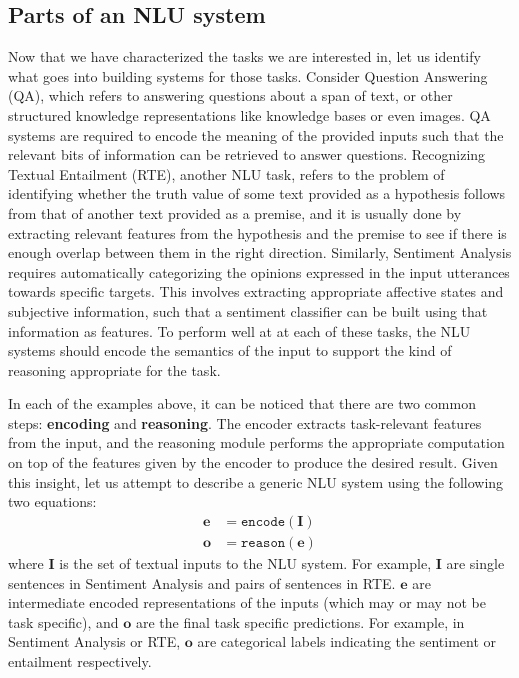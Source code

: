 \subsection{Parts of an NLU system}
Now that we have characterized the tasks we are interested in, let us identify
what goes into building systems for those tasks.
Consider Question Answering (QA), which refers to answering questions about a span of text,
or other structured knowledge representations like knowledge bases or even images.
QA systems are required to encode the meaning of the provided inputs such that the relevant bits of information can be retrieved to answer questions.
Recognizing Textual Entailment (RTE), another NLU task, refers to the problem of identifying whether the truth value of some text provided as a hypothesis follows from that of another 
text provided as a premise, and it is usually done by extracting relevant features from the hypothesis and the premise to see if there is enough
overlap between them in the right direction. Similarly, Sentiment Analysis requires automatically categorizing the opinions expressed in the input
utterances towards specific targets. This involves extracting appropriate affective states and subjective information, such that a sentiment classifier
can be built using that information as features. To perform well at at each of these tasks, the NLU systems should encode the semantics of the input to support the
kind of reasoning appropriate for the task.

In each of the examples above, it can be noticed that there are two common steps: \textbf{encoding} and \textbf{reasoning}. The encoder
extracts task-relevant features from the input, and the reasoning module performs the appropriate computation on top of the features given by the encoder
to produce the desired result. Given this insight, let us attempt to describe a generic NLU system using the following two equations:
\begin{align}
 \mathbf{e} &= \mathtt{encode}(\mathbf{I}) \label{eq:generic_encoding}\\
 \mathbf{o} &= \mathtt{reason}(\mathbf{e}) \label{eq:generic_reasoning}
\end{align}
where $\mathbf{I}$ is the set of textual inputs to the NLU system. 
For example, $\mathbf{I}$  are single sentences in Sentiment Analysis and pairs of sentences in RTE\@. $\textbf{e}$ are intermediate 
encoded representations of the inputs (which may or may not be task specific), and $\mathbf{o}$ are the final task specific predictions. For example, in Sentiment Analysis or RTE, 
$\mathbf{o}$ are categorical labels indicating the sentiment or entailment respectively.

